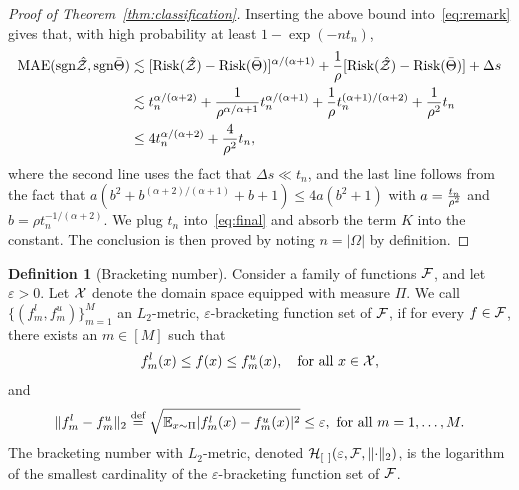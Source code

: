 \documentclass[twoside,11pt]{article}
\theoremstyle{plain}
\theoremstyle{definition}
\newtheorem{defn}{Definition}
\def\sign{\textup{sgn}}
\def\risk{\textup{Risk}}
\begin{document}
\begin{proof}[Proof of Theorem~\ref{thm:classification}]
Inserting the above bound into~\eqref{eq:remark} gives that, with high probability at least $1-\exp(-nt_n)$,
\begin{align}\label{eq:final}
\textup{MAE}(\sign \hat \tZ, \sign \bar \Theta) &\lesssim [\risk(\hat \tZ)-\risk(\bar \Theta)]^{\alpha/(\alpha+1)}+{1\over \rho}[\risk(\hat \tZ)-\risk(\bar \Theta)]+\Delta s\notag \\
&\lesssim t_n^{\alpha/(\alpha+2)}+{1\over \rho^{\alpha/\alpha+1}}t_n^{\alpha/(\alpha+1)}+{1\over \rho}t_n^{(\alpha+1)/(\alpha+2)}+{1\over \rho^2}t_n\notag \\
&\leq 4t_n^{\alpha/(\alpha+2)}+{4\over \rho^2}t_n,
\end{align}
where the second line uses the fact that $\Delta s \ll t_n$, and the last line follows from the fact that $a(b^2+b^{(\alpha+2)/(\alpha+1)}+b+1) \leq 4 a (b^2+1)$ with $a={t_n \over \rho^2}$ and $b=\rho t_n^{-1/(\alpha+2)}$. We plug $t_n$ into~\eqref{eq:final} and absorb the term $K$ into the constant. The conclusion is then proved by noting $n=|\Omega|$ by definition. 
\end{proof}

\begin{defn}[Bracketing number]\label{pro:inftynorm}
Consider a family of functions $\mathcal{F}$, and let $\varepsilon>0$. Let $\mathcal{X} $ denote the domain space equipped with measure $\Pi$. We call $\{(f^l_m,f^u_m)\}_{m=1}^M$ an $L_2$-metric, $\varepsilon$-bracketing function set of $\mathcal{F}$, if for every $f\in \mathcal{F}$, there exists an $m\in[M]$ such that 
\[
f^l_m(x)\leq f(x)\leq f^u_m(x),\quad \text{for all }x\in\mathcal{X},
\]
and
\[
\lVert f^l_m-f^u_m\rVert_2\stackrel{\text{def}}{=}\sqrt{\mathbb{E}_{x\sim \Pi}|f^l_m(x)-f^u_m(x)|^2} \leq \varepsilon, \ \text{for all } m=1,\ldots,M. 
\]
The bracketing number with $L_2$-metric, denoted $\mathcal{H}_{[\ ]}(\varepsilon, \mathcal{F}, \lVert\cdot\rVert_2)$, is the logarithm of the smallest cardinality of the $\varepsilon$-bracketing function set of $\mathcal{F}$.  \\
\end{defn}
\end{document}
